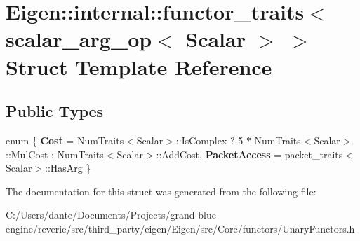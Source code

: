\hypertarget{struct_eigen_1_1internal_1_1functor__traits_3_01scalar__arg__op_3_01_scalar_01_4_01_4}{}\section{Eigen\+::internal\+::functor\+\_\+traits$<$ scalar\+\_\+arg\+\_\+op$<$ Scalar $>$ $>$ Struct Template Reference}
\label{struct_eigen_1_1internal_1_1functor__traits_3_01scalar__arg__op_3_01_scalar_01_4_01_4}
\subsection*{Public Types}
\begin{DoxyCompactItemize}
\item 
\mbox{\label{struct_eigen_1_1internal_1_1functor__traits_3_01scalar__arg__op_3_01_scalar_01_4_01_4_ad56b5965f91d1656f81bb7826a896a8c}} 
enum \{ {\bfseries Cost} = Num\+Traits$<$Scalar$>$\+::Is\+Complex ? 5 $\ast$ Num\+Traits$<$Scalar$>$\+::Mul\+Cost \+: Num\+Traits$<$Scalar$>$\+::Add\+Cost, 
{\bfseries Packet\+Access} = packet\+\_\+traits$<$Scalar$>$\+::Has\+Arg
 \}
\end{DoxyCompactItemize}


The documentation for this struct was generated from the following file\+:\begin{DoxyCompactItemize}
\item 
C\+:/\+Users/dante/\+Documents/\+Projects/grand-\/blue-\/engine/reverie/src/third\+\_\+party/eigen/\+Eigen/src/\+Core/functors/Unary\+Functors.\+h\end{DoxyCompactItemize}
